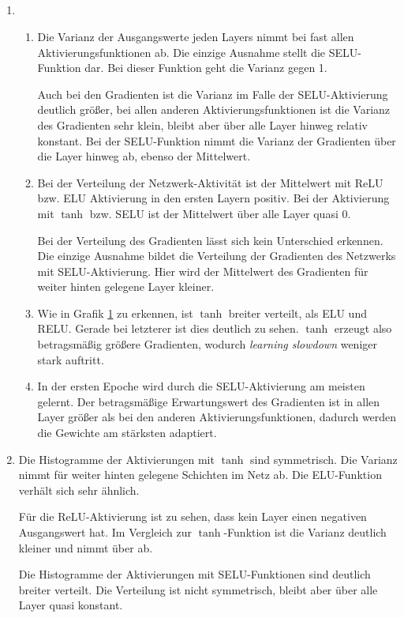 \documentclass[DIN, pagenumber=false, fontsize=11pt, parskip=half]{scrartcl}
\begin{document}
    \subsection{}
    \begin{enumerate}[label=\alph*)]
        \item $ $
            \begin{enumerate}[label=\roman*.]
                \item Die Varianz der Ausgangswerte jeden Layers nimmt bei fast allen Aktivierungsfunktionen ab. Die einzige Ausnahme stellt die SELU-Funktion dar.
                    Bei dieser Funktion geht die Varianz gegen 1.

                    Auch bei den Gradienten ist die Varianz im Falle der SELU-Aktivierung deutlich größer, bei allen anderen Aktivierungsfunktionen ist die Varianz des Gradienten sehr klein, bleibt aber über alle Layer hinweg relativ konstant. Bei der SELU-Funktion nimmt die Varianz der Gradienten über die Layer hinweg ab, ebenso der Mittelwert.
                \item Bei der Verteilung der Netzwerk-Aktivität ist der Mittelwert mit ReLU bzw. ELU Aktivierung in den ersten Layern positiv. Bei der Aktivierung mit $\tanh$ bzw. SELU ist der Mittelwert über alle Layer quasi $0$.

                    Bei der Verteilung des Gradienten lässt sich kein Unterschied erkennen. Die einzige Ausnahme bildet die Verteilung der Gradienten des Netzwerks mit SELU-Aktivierung. Hier wird der Mittelwert des Gradienten für weiter hinten gelegene Layer kleiner.
                \item Wie in Grafik \ref{fig:elu} zu erkennen, ist $\tanh$ breiter verteilt, als ELU und RELU. Gerade bei letzterer ist dies deutlich zu sehen. $\tanh$ erzeugt also betragsmäßig größere Gradienten, wodurch \textit{learning slowdown} weniger stark auftritt.
                    \begin{figure}[H]
                        \centering
                        
                        \caption{}
                        \label{fig:elu}
                    \end{figure}
                \item In der ersten Epoche wird durch die SELU-Aktivierung am meisten gelernt. Der betragsmäßige Erwartungswert des Gradienten ist in allen Layer größer als bei den anderen Aktivierungsfunktionen, dadurch werden die Gewichte am stärksten adaptiert.
            \end{enumerate}
        \item 
            Die Histogramme der Aktivierungen mit $\tanh$ sind symmetrisch. Die Varianz nimmt für weiter hinten gelegene Schichten im Netz ab. Die ELU-Funktion verhält sich sehr ähnlich.

            Für die ReLU-Aktivierung ist zu sehen, dass kein Layer einen negativen Ausgangswert hat. Im Vergleich zur $\tanh$-Funktion ist die Varianz deutlich kleiner und nimmt über ab.

            Die Histogramme der Aktivierungen mit SELU-Funktionen sind deutlich breiter verteilt. Die Verteilung ist nicht symmetrisch, bleibt aber über alle Layer quasi konstant.
    \end{enumerate}
\end{document}
